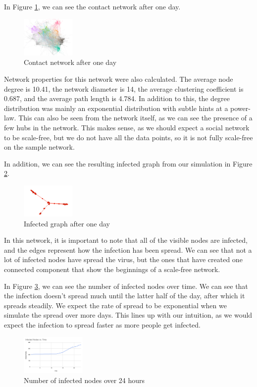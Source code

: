 \documentclass[times, 10pt,twocolumn]{article}
\begin{document}
In Figure \ref{fig:my_label}, we can see the contact network after one day.
\begin{figure}
    \centering
    \includegraphics[width=0.23\textwidth]{imgs/one_day_net.png}
    \caption{Contact network after one day}
    \label{fig:my_label}
\end{figure}
Network properties for this network were also calculated. The average node degree is 10.41, the network diameter is 14, the average clustering coefficient is 0.687, and the average path length is 4.784. In addition to this, the degree distribution was mainly an exponential distribution with subtle hints at a power-law. This can also be seen from the network itself, as we can see the presence of a few hubs in the network. This makes sense, as we should expect a social network to be scale-free, but we do not have all the data points, so it is not fully scale-free on the sample network.

In addition, we can see the resulting infected graph from our simulation in Figure \ref{fig:my_label2}.
\begin{figure}
    \centering
    \includegraphics[width=0.23\textwidth]{imgs/simulation.png}
    \caption{Infected graph after one day}
    \label{fig:my_label2}
\end{figure}
In this network, it is important to note that all of the visible nodes are infected, and the edges represent how the infection has been spread. We can see that not a lot of infected nodes have spread the virus, but the ones that have created one connected component that show the beginnings of a scale-free network. 

In Figure \ref{fig:my_label3}, we can see the number of infected nodes over time. We can see that the infection doesn't spread much until the latter half of the day, after which it spreads steadily. We expect the rate of spread to be exponential when we simulate the spread over more days. This lines up with our intuition, as we would expect the infection to spread faster as more people get infected.
\begin{figure}
    \centering
    \includegraphics[width=0.28\textwidth]{imgs/infected_over_time.png}
    \caption{Number of infected nodes over 24 hours}
    \label{fig:my_label3}
\end{figure}
\end{document}
